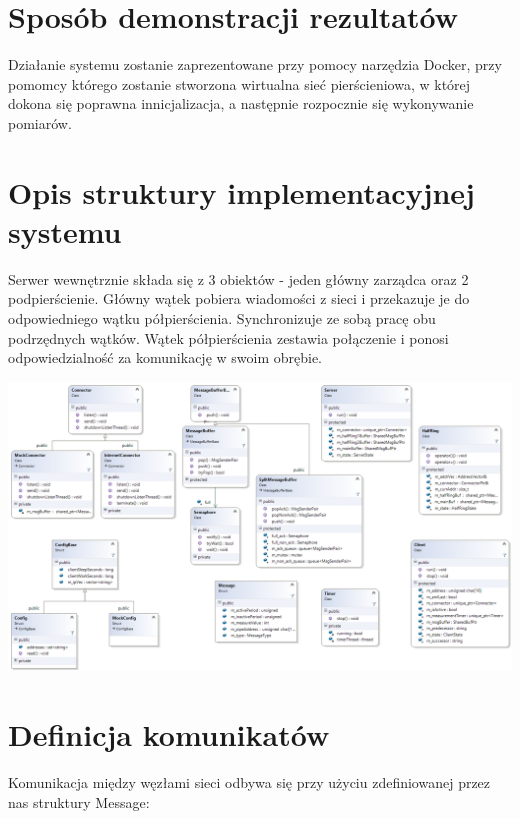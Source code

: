\documentclass[a4paper,11pt]{article}
\begin{document}
\section{Sposób demonstracji rezultatów}
Działanie systemu zostanie zaprezentowane przy pomocy narzędzia Docker,
przy pomomcy którego zostanie stworzona wirtualna sieć pierścieniowa, w której dokona się poprawna innicjalizacja, a następnie rozpocznie się wykonywanie pomiarów.

\section{Opis struktury implementacyjnej systemu}
Serwer wewnętrznie składa się z 3 obiektów - jeden główny zarządca oraz 2 podpierścienie. Główny wątek pobiera wiadomości z sieci i przekazuje je do odpowiedniego wątku półpierścienia. Synchronizuje ze sobą pracę obu podrzędnych wątków. Wątek półpierścienia zestawia połączenie i ponosi odpowiedzialność za komunikację w swoim obrębie.

\begin{landscape}
  \pagestyle{empty}
\begin{center}
    \centerline{\includegraphics[width=1.4\textwidth]{class_diagram}}
\end{center}
\end{landscape}
\newpage


\section{Definicja komunikatów}
Komunikacja między węzłami sieci odbywa się przy użyciu zdefiniowanej przez nas
struktury Message:
\end{document}
